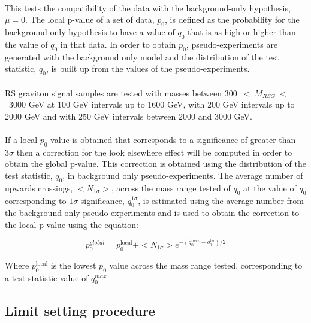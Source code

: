 \paragraph{}
This tests the compatibility of the data with the background-only hypothesis, $\mu = 0$. The local p-value of a set of data, $p_0$, is defined as the probability for the background-only hypothesis to have a value of $q_0$ that is as high or higher than the value of $q_{0}$ in that data. In order to obtain $p_0$, pseudo-experiments are generated with the background only model and the distribution of the test statistic, $q_{0}$, is built up from the values of the pseudo-experiments.

\paragraph{}
RS graviton signal samples are tested with masses between 300~$<~M_{RSG}~<$~3000 GeV at 100 GeV intervals up to 1600 GeV, with 200 GeV intervals up to 2000 GeV and with 250 GeV intervals between 2000 and 3000 GeV.

\paragraph{}
If a local $p_{0}$ value is obtained that corresponds to a significance of greater than $3\sigma$ then a correction for the look elsewhere effect will be computed in order to obtain the global p-value. This correction is obtained using the distribution of the test statistic, $q_{0}$, in background only pseudo-experiments. The average number of upwards crossings, $<N_{1\sigma}>$, across the mass range tested of $q_{0}$ at the value of $q_{0}$ corresponding to $1\sigma$ significance, $q_{0}^{1\sigma}$, is estimated using the average number from the background only pseudo-experiments and is used to obtain the correction to the local p-value using the equation:

\begin{equation}
  p_{0}^{global} = p_{0}^{\text{local}} + <N_{1\sigma}>e^{-(q_{0}^{max} - q_{0}^{1\sigma})/2}
\end{equation}

\noindent
Where $p_{0}^{\text{local}}$ is the lowest $p_{0}$ value across the mass range tested, 
corresponding to a test statistic value of $q_{0}^{max}$. 


\subsection{Limit setting procedure}

